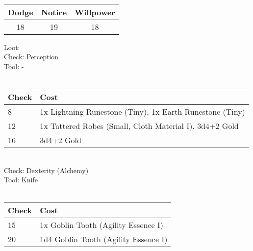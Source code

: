 \\
\begin{minipage}[H]{1\textwidth}
	\centering
	\begin{tabular}[c]{|c | c | c|}
		\hline
		Dodge & Notice & Willpower\\
		\hline
		18 & 19 & 18\\
		\hline
	\end{tabular}
\end{minipage}
Loot:\\
Check: Perception\\
Tool: -\\
\\
\begin{minipage}{0.8\textwidth}
	\begin{tabular}{|l | l|}
		\hline
		Check & Cost\\
		\hline
		8 & 1x Lightning Runestone (Tiny), 1x Earth Runestone (Tiny)\\
		12 & 1x Tattered Robes (Small, Cloth Material I), 3d4+2 Gold\\
		16 & 3d4+2 Gold\\
		\hline
	\end{tabular}
\end{minipage}
\\
Check: Dexterity (Alchemy)\\
Tool: Knife\\
\\
\begin{minipage}{0.8\textwidth}
	\begin{tabular}{|l | l|}
		\hline
		Check & Cost\\
		\hline
		15 & 1x Goblin Tooth (Agility Essence I)\\
		20 & 1d4 Goblin Tooth (Agility Essence I)\\
		\hline
	\end{tabular}
\end{minipage}
\pagebreak